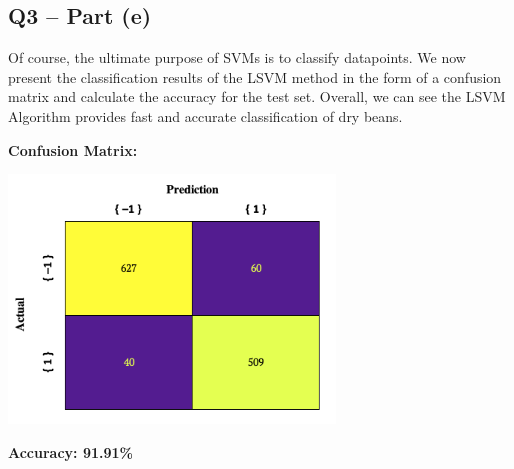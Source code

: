 \documentclass{article}
\begin{document}
\subsection*{Q3 – Part (e)}
Of course, the ultimate purpose of SVMs is to classify datapoints. We now present the classification results of the LSVM method in the form of a confusion matrix and calculate the accuracy for the test set. Overall, we can see the LSVM Algorithm provides fast and accurate classification of dry beans.\par

\textbf{Confusion Matrix:} 
\begin{center}
    \includegraphics[width=0.65\textwidth]{Confusion Matrix.png}
\end{center} \par

\textbf{Accuracy: 91.91\%}




\newpage
\end{document}
